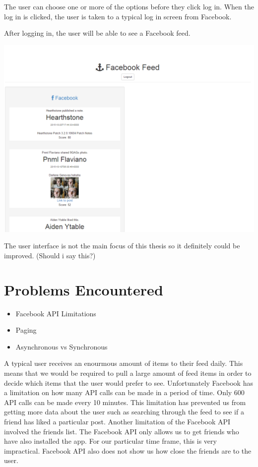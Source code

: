 The user can choose one or more of the options before they click log in. When the log in is clicked, the user is taken to a typical log in screen from Facebook.

After logging in, the user will be able to see a Facebook feed.

\begin{center}
  \includegraphics[scale=0.5]{images/rankedFeed.png}
\end{center}

The user interface is not the main focus of this thesis so it definitely could be improved. (Should i say this?)

\section{Problems Encountered}

\begin{itemize}
  	\item Facebook API Limitations
	\item Paging
	\item Asynchronous vs Synchronous
\end{itemize}

A typical user receives an enourmous amount of items to their feed daily. This means that we would be required to pull a large amount of feed items in order to decide which items that the user would prefer to see. Unfortunately Facebook has a limitation on how many API calls can be made in a period of time. Only 600 API calls can be made every 10 minutes. This limitation has prevented us from getting more data about the user such as searching through the feed to see if a friend has liked a particular post. Another limitation of the Facebook API involved the friends list. The Facebook API only allows us to get friends who have also installed the app. For our particular time frame, this is very impractical. Facebook API also does not show us how close the friends are to the user.  

